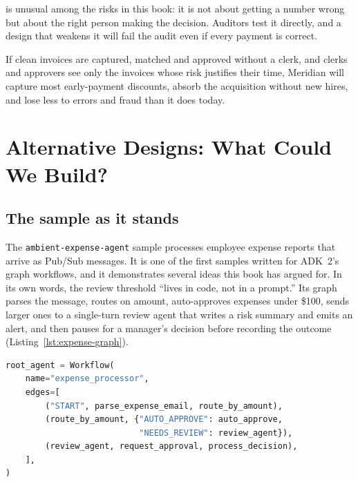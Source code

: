  is unusual among the risks in this book: it is not about getting a number wrong but about the right person making the decision. Auditors test it directly, and a design that weakens it will fail the audit even if every payment is correct.

\begin{keyidea}
If clean invoices are captured, matched and approved without a clerk, and clerks and approvers see only the invoices whose risk justifies their time, Meridian will capture most early-payment discounts, absorb the acquisition without new hires, and lose less to errors and fraud than it does today.
\end{keyidea}

\section{Alternative Designs: What Could We Build?}
\label{sec:inv-designs}

\subsection{The sample as it stands}

The \texttt{ambient-expense-agent} sample processes employee expense reports that arrive as Pub/Sub messages. It is one of the first samples written for ADK~2's graph workflows, and it demonstrates several ideas this book has argued for. In its own words, the review threshold ``lives in code, not in a prompt.'' Its graph parses the message, routes on amount, auto-approves expenses under \$100, sends larger ones to a single-turn review agent that writes a risk summary and emits an alert, and then pauses for a manager's decision before recording the outcome (Listing~\ref{lst:expense-graph}).

\begin{lstlisting}[language=Python, caption={The sample's workflow graph (from \texttt{expense\_agent/agent.py} at commit \texttt{1b20a7a}).}, label={lst:expense-graph}]
root_agent = Workflow(
    name="expense_processor",
    edges=[
        ("START", parse_expense_email, route_by_amount),
        (route_by_amount, {"AUTO_APPROVE": auto_approve,
                           "NEEDS_REVIEW": review_agent}),
        (review_agent, request_approval, process_decision),
    ],
)
\end{lstlisting}

